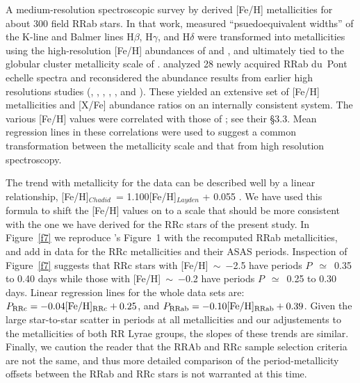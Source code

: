 \documentclass[preprint]{aastex6}
\begin{document}
A medium-resolution spectroscopic survey by \cite{layden94} 
derived [Fe/H] metallicities for about 300 field RRab stars.
In that work, measured ``psuedoequivalent widths'' of the K-line and Balmer 
lines H$\beta$, H$\gamma$, and H$\delta$ were transformed into metallicities
using the high-resolution [Fe/H] abundances of \cite{butler75} and 
\cite{butler82}, and ultimately tied to the globular cluster metallicity scale
of \cite{zinn84}.
\cite{chadid17} analyzed 28 newly acquired RRab du~Pont echelle spectra
and reconsidered the abundance results from earlier high resolutions 
studies (\citealt{clementini95}, \citealt{fernley96}, \citealt{lambert96}, 
\citealt{nemec13}, \citealt{liu13}, \citealt{pancino15} and 
\citealt{for11b}).
These yielded an extensive set of [Fe/H] metallicities and [X/Fe] abundance 
ratios on an internally consistent system.
The various [Fe/H] values were correlated with those of 
\citeauthor{layden94}; see their \S3.3.
Mean regression lines in these correlations were used to suggest a common
transformation between the \citeauthor{layden94} metallicity scale and that
from high resolution spectroscopy.

The trend with metallicity for the \cite{chadid17} data can be described
well by a linear relationship,
[Fe/H]$_{Chadid}$~= 1.100[Fe/H]$_{Layden}$ + 0.055 .
We have used this formula to shift the \cite{layden94} [Fe/H] values
on to a scale that should be more consistent with the one we have derived
for the RRc stars of the present study.
In Figure~\ref{f7} we reproduce \citeauthor{layden95b}'s Figure~1 with
the recomputed RRab metallicities, and add in data for the RRc metallicities
and their ASAS periods.
Inspection of Figure~\ref{f7} suggests that RRc stars with
[Fe/H]~$\sim$~$-$2.5 have periods $P$~$\simeq$~0.35 to 0.40 days while
those with [Fe/H]~$\sim$~$-$0.2 have periods $P$~$\simeq$~0.25 to 0.30 days.
Linear regression lines for the whole data sets are:
$P_{\rm RRc} = -0.04{[\rm Fe/H]_{RRc}} + 0.25$, and 
$P_{\rm RRab} = -0.10{[\rm Fe/H]_{RRab}} + 0.39$.
Given the large star-to-star scatter in periods at all metallicities and
our adjustements to the metallicities of both RR Lyrae groups, the
slopes of these trends are similar.
Finally, we caution the reader that the RRAb and RRc sample selection 
criteria are not the same, and thus more detailed comparison of the 
period-metallicity offsets between the RRab and RRc stars is
not warranted at this time.
\end{document}
